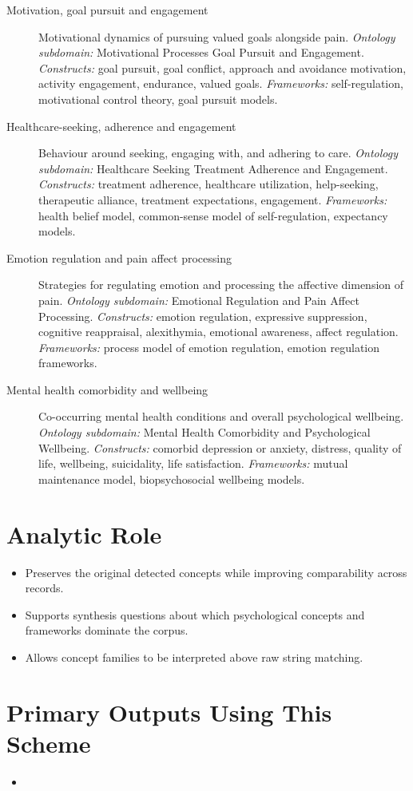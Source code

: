 \documentclass[11pt]{article}
\begin{document}
\begin{description}
\item[Motivation, goal pursuit and engagement] Motivational dynamics of pursuing valued goals alongside pain.
{\small \textit{Ontology subdomain:} Motivational Processes Goal Pursuit and Engagement. \textit{Constructs:} goal pursuit, goal conflict, approach and avoidance motivation, activity engagement, endurance, valued goals. \textit{Frameworks:} self-regulation, motivational control theory, goal pursuit models.}
\item[Healthcare-seeking, adherence and engagement] Behaviour around seeking, engaging with, and adhering to care.
{\small \textit{Ontology subdomain:} Healthcare Seeking Treatment Adherence and Engagement. \textit{Constructs:} treatment adherence, healthcare utilization, help-seeking, therapeutic alliance, treatment expectations, engagement. \textit{Frameworks:} health belief model, common-sense model of self-regulation, expectancy models.}
\item[Emotion regulation and pain affect processing] Strategies for regulating emotion and processing the affective dimension of pain.
{\small \textit{Ontology subdomain:} Emotional Regulation and Pain Affect Processing. \textit{Constructs:} emotion regulation, expressive suppression, cognitive reappraisal, alexithymia, emotional awareness, affect regulation. \textit{Frameworks:} process model of emotion regulation, emotion regulation frameworks.}
\item[Mental health comorbidity and wellbeing] Co-occurring mental health conditions and overall psychological wellbeing.
{\small \textit{Ontology subdomain:} Mental Health Comorbidity and Psychological Wellbeing. \textit{Constructs:} comorbid depression or anxiety, distress, quality of life, wellbeing, suicidality, life satisfaction. \textit{Frameworks:} mutual maintenance model, biopsychosocial wellbeing models.}
\end{description}

\section*{Analytic Role}
\begin{itemize}
\item Preserves the original detected concepts while improving comparability across records.
\item Supports synthesis questions about which psychological concepts and frameworks dominate the corpus.
\item Allows concept families to be interpreted above raw string matching.
\end{itemize}

\section*{Primary Outputs Using This Scheme}
\begin{itemize}
\item {}
\end{itemize}
\end{document}
